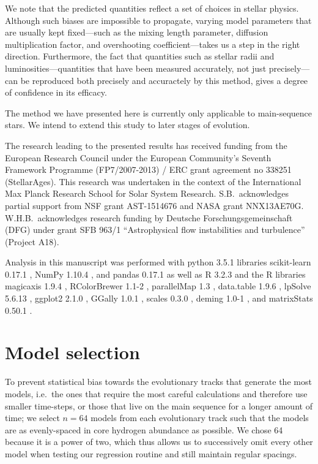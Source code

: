 \documentclass[twocolumn,twocolappendix]{aastex6}
\newif\ifref
\newcommand{\mb}[1]{\ifref\boldmath\textbf{#1}\unboldmath\else #1\fi}
\begin{document}
We note that the predicted quantities reflect a set of choices in stellar physics. Although such biases are impossible to propagate, varying model parameters that are usually kept fixed---such as the mixing length parameter, diffusion \mb{multiplication} factor, and overshooting coefficient---takes us a step in the right direction. Furthermore, the fact that quantities such as stellar radii and luminosities---quantities that have been measured accurately, not just precisely---can be reproduced both precisely and accuractely by this method, gives a degree of confidence in its efficacy. 

The method we have presented here is currently only applicable to main-sequence stars. We intend to extend this study to later stages of evolution. 


\acknowledgments The research leading to the presented results has received funding from the European Research Council under the European Community's Seventh Framework Programme (FP7/2007-2013) / ERC grant agreement no 338251 (StellarAges). This research was undertaken in the context of the International Max Planck Research School \mb{for Solar System Research}. S.B.\ acknowledges partial support from NSF grant AST-1514676 and NASA grant NNX13AE70G. W.H.B.\ acknowledges research funding by Deutsche Forschungsgemeinschaft (DFG) under grant SFB 963/1 ``Astrophysical flow instabilities and turbulence'' (Project A18).

\software Analysis in this manuscript was performed with \mb{python 3.5.1} libraries scikit-learn \mb{0.17.1} \citep{scikit-learn}, NumPy \mb{1.10.4} \citep{van2011numpy}, and pandas \mb{0.17.1} \citep{mckinney2010data} as well as \mb{R 3.2.3} \citep{R} and the R libraries magicaxis \mb{1.9.4} \citep{magicaxis}, RColorBrewer \mb{1.1-2} \citep{RColorBrewer}, parallelMap \mb{1.3} \citep{parallelMap}, data.table \mb{1.9.6} \citep{data.table}, lpSolve \mb{5.6.13} \citep{lpSolve}, ggplot2 \mb{2.1.0} \citep{ggplot2}, GGally \mb{1.0.1} \citep{GGally}, scales \mb{0.3.0} \citep{scales}, deming \mb{1.0-1} \citep{deming}, and matrixStats \mb{0.50.1} \citep{matrixStats}.

\appendix


\section{Model selection}
\label{sec:selection}
To prevent statistical bias towards the evolutionary tracks that generate the most models, i.e.\ the ones that require the most careful calculations and therefore use smaller time-steps, or those that live on the main sequence for a longer amount of time; we select $n=64$ models from each evolutionary track such that the models are as evenly-spaced in core hydrogen abundance as possible. \mb{We chose 64 because it is a power of two, which thus allows us to successively omit every other model when testing our regression routine and still maintain regular spacings.}
\end{document}
